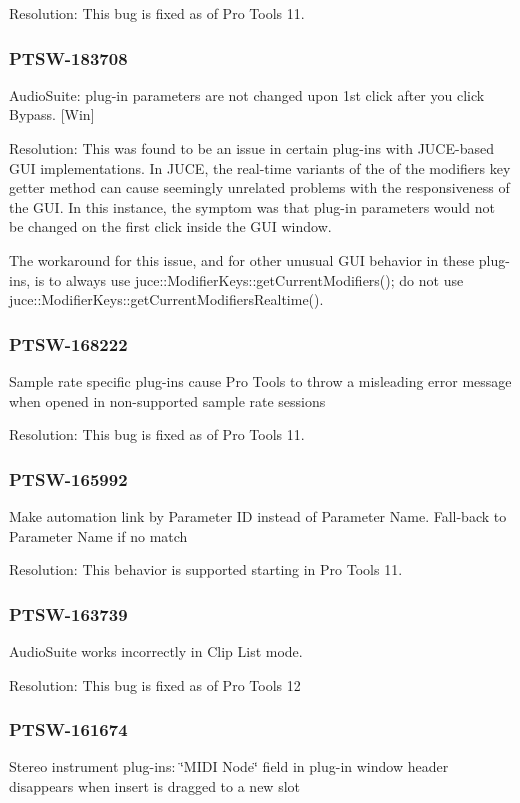Resolution\+: This bug is fixed as of Pro Tools 11.\hypertarget{a00846_PTSW-183708}{}\subsubsection{P\+T\+S\+W-\/183708}\label{a00846_PTSW-183708}
Audio\+Suite\+: plug-\/in parameters are not changed upon 1st click after you click Bypass. \mbox{[}Win\mbox{]}

Resolution\+: This was found to be an issue in certain plug-\/ins with J\+U\+C\+E-\/based G\+UI implementations. In J\+U\+CE, the real-\/time variants of the of the modifiers key getter method can cause seemingly unrelated problems with the responsiveness of the G\+UI. In this instance, the symptom was that plug-\/in parameters would not be changed on the first click inside the G\+UI window.

The workaround for this issue, and for other unusual G\+UI behavior in these plug-\/ins, is to always use {\ttfamily juce\+::\+Modifier\+Keys\+::get\+Current\+Modifiers()}; do not use {\ttfamily juce\+::\+Modifier\+Keys\+::get\+Current\+Modifiers\+Realtime()}.\hypertarget{a00846_PTSW-168222}{}\subsubsection{P\+T\+S\+W-\/168222}\label{a00846_PTSW-168222}
Sample rate specific plug-\/ins cause Pro Tools to throw a misleading error message when opened in non-\/supported sample rate sessions

Resolution\+: This bug is fixed as of Pro Tools 11.\hypertarget{a00846_PTSW-165992}{}\subsubsection{P\+T\+S\+W-\/165992}\label{a00846_PTSW-165992}
Make automation link by Parameter ID instead of Parameter Name. Fall-\/back to Parameter Name if no match

Resolution\+: This behavior is supported starting in Pro Tools 11.\hypertarget{a00846_PTSW-163739}{}\subsubsection{P\+T\+S\+W-\/163739}\label{a00846_PTSW-163739}
Audio\+Suite works incorrectly in Clip List mode.

Resolution\+: This bug is fixed as of Pro Tools 12\hypertarget{a00846_PTSW-161674}{}\subsubsection{P\+T\+S\+W-\/161674}\label{a00846_PTSW-161674}
Stereo instrument plug-\/ins\+: \char`\"{}\+M\+I\+D\+I Node\char`\"{} field in plug-\/in window header disappears when insert is dragged to a new slot

